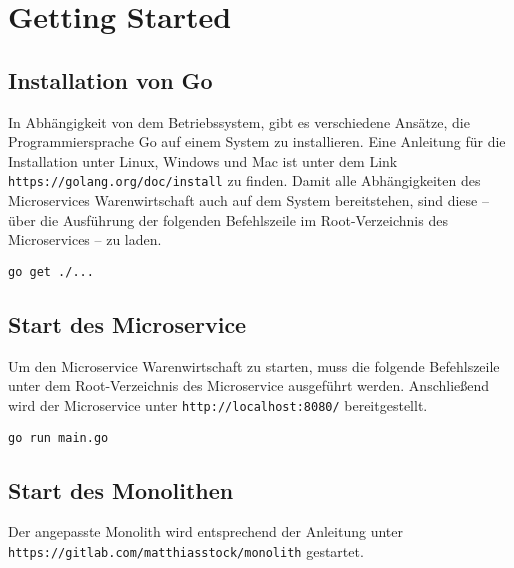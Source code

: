 \section{Getting Started}
\label{sec: Getting Started}

\subsection{Installation von Go}
In Abhängigkeit von dem Betriebssystem, gibt es verschiedene Ansätze, die Programmiersprache Go auf einem System zu installieren. Eine Anleitung für die Installation unter Linux, Windows und Mac ist unter dem Link \texttt{https://golang.org/doc/install} zu finden. Damit alle Abhängigkeiten des Microservices Warenwirtschaft auch auf dem System bereitstehen, sind diese -- über die Ausführung der folgenden Befehlszeile im Root-Verzeichnis des Microservices -- zu laden.
\begin{lstlisting}[caption=Laden der Abhängigkeiten]
go get ./...
\end{lstlisting}

\subsection{Start des Microservice}
Um den Microservice Warenwirtschaft zu starten, muss die folgende Befehlszeile unter dem Root-Verzeichnis des Microservice ausgeführt werden. Anschließend wird der Microservice unter \texttt{http://localhost:8080/} bereitgestellt. 
\begin{lstlisting}[caption=Start des Go-Microservice]
go run main.go
\end{lstlisting}

\subsection{Start des Monolithen}
Der angepasste Monolith wird entsprechend der Anleitung unter \linebreak \texttt{https://gitlab.com/matthiasstock/monolith} gestartet. 